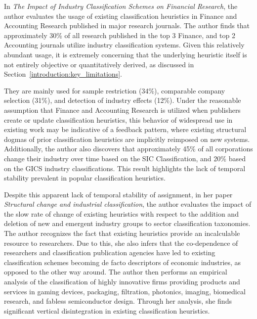 \documentclass[../main.tex]{subfiles}
\begin{document}
In \textit{The Impact of Industry Classification Schemes on Financial Research}, the author evaluates the usage of existing classification heuristics in Finance and Accounting Research published in major research journals. The author finds that approximately 30\% of all research published in the top 3 Finance, and top 2 Accounting journals utilize industry classification systems. Given this relatively abundant usage, it is extremely concerning that the underlying heuristic itself is not entirely objective or quantitatively derived, as discussed in Section~\ref{introduction:key_limitations}.

They are mainly used for sample restriction (34\%), comparable company selection (31\%), and detection of industry effects (12\%). Under the reasonable assumption that Finance and Accounting Research is utilized when publishers create or update classification heuristics, this behavior of widespread use in existing work may be indicative of a feedback pattern, where existing structural dogmas of prior classification heuristics are implicitly reimposed on new systems. Additionally, the author also discovers that approximately 45\% of all corporations change their industry over time based on the SIC Classification, and 20\% based on the GICS industry classifications. This result highlights the lack of temporal stability prevalent in popular classification heuristics.

Despite this apparent lack of temporal stability of assignment, in her paper \textit{Structural change and industrial classification}, the author evaluates the impact of the slow rate of change of existing heuristics with respect to the addition and deletion of new and emergent industry groups to sector classification taxonomies. The author recognizes the fact that existing heuristics provide an incalculable resource to researchers. Due to this, she also infers that the co-dependence of researchers and classification publication agencies have led to existing classification schemes becoming de facto descriptors of economic industries, as opposed to the other way around. The author then performs an empirical analysis of the classification of highly innovative firms providing products and services in gaming devices, packaging, filtration, photonics, imaging, biomedical research, and fabless semiconductor design. Through her analysis, she finds significant vertical disintegration in existing classification heuristics.
\end{document}
